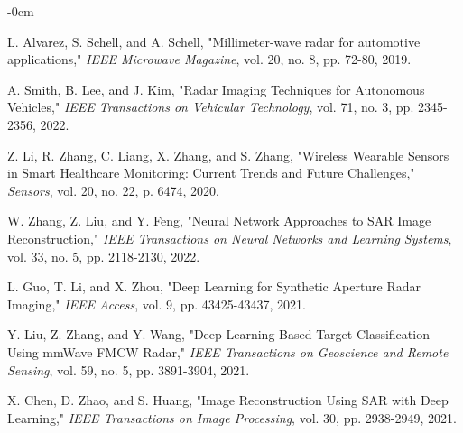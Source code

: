 \documentclass[journal,article,submit,pdftex,moreauthors]{Definitions/mdpi}
\begin{document}



\dataavailability{}


\begin{adjustwidth}{-\extralength}{0cm}


\begin{thebibliography}{999}
L. Alvarez, S. Schell, and A. Schell, "Millimeter-wave radar for automotive applications," \textit{IEEE Microwave Magazine}, vol. 20, no. 8, pp. 72-80, 2019.

A. Smith, B. Lee, and J. Kim, "Radar Imaging Techniques for Autonomous Vehicles," \textit{IEEE Transactions on Vehicular Technology}, vol. 71, no. 3, pp. 2345-2356, 2022.

Z. Li, R. Zhang, C. Liang, X. Zhang, and S. Zhang, "Wireless Wearable Sensors in Smart Healthcare Monitoring: Current Trends and Future Challenges," \textit{Sensors}, vol. 20, no. 22, p. 6474, 2020.

W. Zhang, Z. Liu, and Y. Feng, "Neural Network Approaches to SAR Image Reconstruction," \textit{IEEE Transactions on Neural Networks and Learning Systems}, vol. 33, no. 5, pp. 2118-2130, 2022.

L. Guo, T. Li, and X. Zhou, "Deep Learning for Synthetic Aperture Radar Imaging," \textit{IEEE Access}, vol. 9, pp. 43425-43437, 2021.

Y. Liu, Z. Zhang, and Y. Wang, "Deep Learning-Based Target Classification Using mmWave FMCW Radar," \textit{IEEE Transactions on Geoscience and Remote Sensing}, vol. 59, no. 5, pp. 3891-3904, 2021.

X. Chen, D. Zhao, and S. Huang, "Image Reconstruction Using SAR with Deep Learning," \textit{IEEE Transactions on Image Processing}, vol. 30, pp. 2938-2949, 2021.


\end{thebibliography}
\end{adjustwidth}
\end{document}
